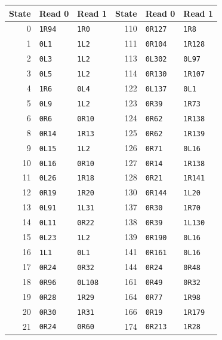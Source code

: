 \small
\begin{longtable}{@{}rll@{\hspace{1.2cm}}rll@{}}
\toprule State & Read 0 & Read 1 & State & Read 0 & Read 1\\\midrule\endhead
0 & \texttt{1R94} & \texttt{1R0} & 110 & \texttt{0R127} & \texttt{1R8}\\
1 & \texttt{0L1} & \texttt{1L2} & 111 & \texttt{0R104} & \texttt{1R128}\\
2 & \texttt{0L3} & \texttt{1L2} & 113 & \texttt{0L302} & \texttt{0L97}\\
3 & \texttt{0L5} & \texttt{1L2} & 114 & \texttt{0R130} & \texttt{1R107}\\
4 & \texttt{1R6} & \texttt{0L4} & 122 & \texttt{0L137} & \texttt{0L1}\\
5 & \texttt{0L9} & \texttt{1L2} & 123 & \texttt{0R39} & \texttt{1R73}\\
6 & \texttt{0R6} & \texttt{0R10} & 124 & \texttt{0R62} & \texttt{1R138}\\
8 & \texttt{0R14} & \texttt{1R13} & 125 & \texttt{0R62} & \texttt{1R139}\\
9 & \texttt{0L15} & \texttt{1L2} & 126 & \texttt{0R71} & \texttt{0L16}\\
10 & \texttt{0L16} & \texttt{0R10} & 127 & \texttt{0R14} & \texttt{1R138}\\
11 & \texttt{0L26} & \texttt{1R18} & 128 & \texttt{0R21} & \texttt{1R141}\\
12 & \texttt{0R19} & \texttt{1R20} & 130 & \texttt{0R144} & \texttt{1L20}\\
13 & \texttt{0L91} & \texttt{1L31} & 137 & \texttt{0R30} & \texttt{1R70}\\
14 & \texttt{0L11} & \texttt{0R22} & 138 & \texttt{0R39} & \texttt{1L130}\\
15 & \texttt{0L23} & \texttt{1L2} & 139 & \texttt{0R190} & \texttt{0L16}\\
16 & \texttt{1L1} & \texttt{0L1} & 141 & \texttt{0R161} & \texttt{0L16}\\
17 & \texttt{0R24} & \texttt{0R32} & 144 & \texttt{0R24} & \texttt{0R48}\\
18 & \texttt{0R96} & \texttt{0L108} & 161 & \texttt{0R49} & \texttt{0R32}\\
19 & \texttt{0R28} & \texttt{1R29} & 164 & \texttt{0R77} & \texttt{1R98}\\
20 & \texttt{0R30} & \texttt{1R31} & 166 & \texttt{0R19} & \texttt{1R179}\\
21 & \texttt{0R24} & \texttt{0R60} & 174 & \texttt{0R213} & \texttt{1R28}\\

\end{longtable}
